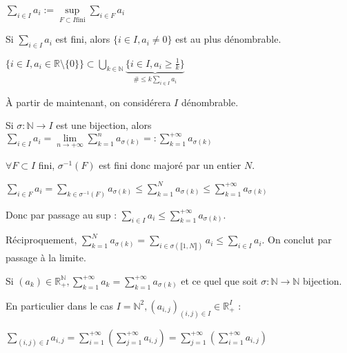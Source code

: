\documentclass[10pt,a4paper,notitlepage ]{report}
\begin{document}
\begin{definition}
	$\sum_{i \in I} a_i := \underset{F \subset I \mathrm{fini}}{\sup}\sum_{i \in F}a_i$
\end{definition}
\begin{propriete}
	Si $\sum_{i \in I} a_i$ est fini, alors $\{i \in I, a_i\neq 0\}$ est au plus dénombrable.
\end{propriete}

\begin{demo}
	$\{i\in I, a_i \in \mathbb R \setminus \{0\}\} \subset \underset{k \in \mathbb N}{\bigcup}
	\underset{\# \le k\sum_{i\in I} a_i}{\underbrace{\{i \in I, a_i \ge \frac{1}{k}\}}}$
\end{demo}

À partir de maintenant, on considérera $I$ dénombrable.

\begin{propriete}
	Si $\sigma : \mathbb N \rightarrow I$ est une bijection, alors
	$\sum_{i\in I}a_i = \underset{n \rightarrow +\infty}{\lim}\sum_{k=1}^{n}a_{\sigma (k)} =: \sum_{k=1}^{+\infty}a_{\sigma(k)}$
\end{propriete}

\begin{demo}
	$\forall F \subset I$ fini, $\sigma ^{-1}(F)$ est fini donc majoré par un entier $N$.
	
	$\sum_{i\in F}a_i = \sum_{k\in \sigma^{-1}(F)}a_{\sigma(k)} \le \sum_{k=1}^N a_{\sigma(k)} \le \sum_{k=1}^{+\infty}a_{\sigma(k)}$
	
	Donc par passage au sup : $\sum_{i\in I} a_i \le \sum_{k=1}^{+\infty}a_{\sigma(k)}$.
	
	Réciproquement, $\sum_{k=1}^N a_{\sigma(k)} = \sum_{i\in\sigma(\llbracket 1,N \rrbracket)} a_i \le \sum_{i\in I}a_i$. On conclut par passage à la limite.
\end{demo}

\begin{corollaire}
	Si $(a_k) \in \mathbb R_+^{\mathbb N}, \sum_{k=1}^{+\infty}a_k=\sum_{k=1}^{+\infty}a_{\sigma(k)}$ et ce quel que soit $\sigma : \mathbb N \rightarrow \mathbb N$ bijection.
\end{corollaire}

En particulier dans le cas $I=\mathbb N^2, (a_{i,j})_{(i,j)\in I}\in \mathbb R_+^I$ :
\begin{propriete}
	$\sum_{(i,j)\in I}a_{i,j} = \sum_{i=1}^{+\infty}\left(\sum_{j=1}^{+\infty}a_{i,j}\right) =
	\sum_{j=1}^{+\infty}\left(\sum_{i=1}^{+\infty}a_{i,j}\right)$
\end{propriete}
\end{document}
